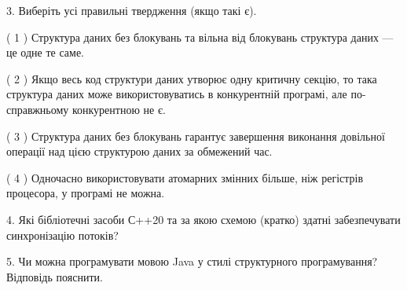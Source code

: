 \documentclass[12pt, ukrainian]{article}
\begin{document}
\begin {large}
{\vspace{5mm}
3. Виберіть усі правильні твердження (якщо такі є).\par
\vspace{2mm}

( 1 ) Структура даних без блокувань та вільна від блокувань структура даних --- це одне те саме.%

( 2 ) Якщо весь код структури даних утворює одну критичну секцію, то така структура даних може використовуватись в конкурентній програмі, але по-справжньому конкурентною не є.%

( 3 ) Структура даних без блокувань гарантує завершення виконання довільної операції над цією структурою даних за обмежений час.%

( 4 ) Одночасно використовувати атомарних змінних більше, ніж регістрів процесора, у програмі не можна.%


\vspace{5mm}
4. Які бібліотечні засоби С++20 та за якою схемою (кратко) здатні забезпечувати синхронізацію потоків?



\vspace{5mm}
5. Чи можна програмувати мовою Java у стилі структурного програмування? Відповідь пояснити.
}
\end {large}
\end{document}
